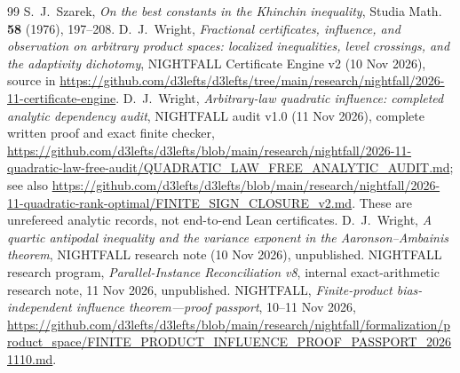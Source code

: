 \documentclass[11pt]{article}
\numberwithin{equation}{section}
\theoremstyle{remark}
\begin{document}
\begin{thebibliography}{99}
 S.~J.~Szarek, \emph{On the best constants in the Khinchin inequality}, Studia Math. \textbf{58} (1976), 197--208.
 D.~J.~Wright, \emph{Fractional certificates, influence, and observation on arbitrary product spaces: localized inequalities, level crossings, and the adaptivity dichotomy}, NIGHTFALL Certificate Engine v2 (10 Nov 2026), source in \url{https://github.com/d3lefts/d3lefts/tree/main/research/nightfall/2026-11-certificate-engine}.
 D.~J.~Wright, \emph{Arbitrary-law quadratic influence: completed analytic dependency audit}, NIGHTFALL audit v1.0 (11 Nov 2026), complete written proof and exact finite checker, \url{https://github.com/d3lefts/d3lefts/blob/main/research/nightfall/2026-11-quadratic-law-free-audit/QUADRATIC_LAW_FREE_ANALYTIC_AUDIT.md}; see also \url{https://github.com/d3lefts/d3lefts/blob/main/research/nightfall/2026-11-quadratic-rank-optimal/FINITE_SIGN_CLOSURE_v2.md}. These are unrefereed analytic records, not end-to-end Lean certificates.
 D.~J.~Wright, \emph{A quartic antipodal inequality and the variance exponent in the Aaronson--Ambainis theorem}, NIGHTFALL research note (10 Nov 2026), unpublished.
 NIGHTFALL research program, \emph{Parallel-Instance Reconciliation v8}, internal exact-arithmetic research note, 11 Nov 2026, unpublished.
 NIGHTFALL, \emph{Finite-product bias-independent influence theorem---proof passport}, 10--11 Nov 2026, \url{https://github.com/d3lefts/d3lefts/blob/main/research/nightfall/formalization/product_space/FINITE_PRODUCT_INFLUENCE_PROOF_PASSPORT_20261110.md}.
\end{thebibliography}
\end{document}
